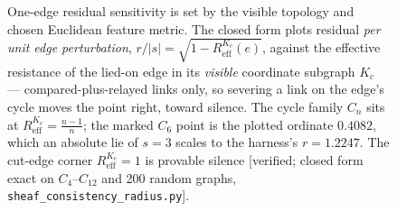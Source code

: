 \begin{figure}[htbp]
\caption{One-edge residual sensitivity is set by the visible topology and chosen Euclidean feature metric. The closed form plots residual \emph{per unit edge perturbation},
$r/|s|=\sqrt{1-R^{K_c}_{\mathrm{eff}}(e)}$, against the effective resistance of the lied-on edge in its \emph{visible}
coordinate subgraph $K_c$ --- compared-plus-relayed links only, so severing a link on the edge's cycle moves the point
right, toward silence. The cycle family $C_n$ sits at $R^{K_c}_{\mathrm{eff}}=\tfrac{n-1}{n}$; the marked $C_6$ point is
the plotted ordinate $0.4082$, which an absolute lie of $s=3$ scales to the harness's $r=1.2247$. The cut-edge corner
$R^{K_c}_{\mathrm{eff}}=1$ is provable silence [verified; closed form exact on $C_4$--$C_{12}$ and 200 random graphs,
\texttt{sheaf\_consistency\_radius.py}].}
\label{fig:radius}
\end{figure}

